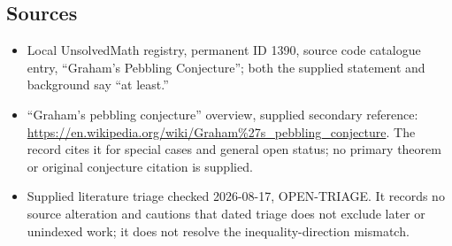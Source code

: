 \documentclass[11pt]{article}
\begin{document}
\subsection{Sources}
\begin{itemize}
\item Local UnsolvedMath registry, permanent ID 1390, source code catalogue entry, ``Graham's Pebbling Conjecture''; both the supplied statement and background say ``at least.''
\item ``Graham's pebbling conjecture'' overview, supplied secondary reference: \url{https://en.wikipedia.org/wiki/Graham%27s_pebbling_conjecture}. The record cites it for special cases and general open status; no primary theorem or original conjecture citation is supplied.
\item Supplied literature triage checked 2026-08-17, OPEN-TRIAGE. It records no source alteration and cautions that dated triage does not exclude later or unindexed work; it does not resolve the inequality-direction mismatch.
\end{itemize}
\end{document}
